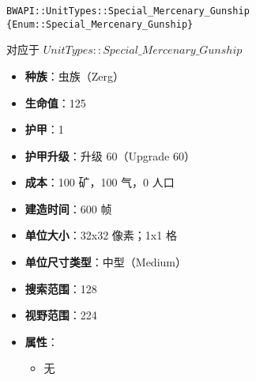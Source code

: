 \begin{tcolorbox}[colback=white, colframe=black!60!white, title=Special\_Mercenary\_Gunship(), arc=0mm]
    \begin{verbatim}
BWAPI::UnitTypes::Special_Mercenary_Gunship {Enum::Special_Mercenary_Gunship}
    \end{verbatim}
    对应于  $UnitTypes::Special\_Mercenary\_Gunship$ 
    \begin{itemize}
        \item \textbf{种族}：虫族（Zerg）
        \item \textbf{生命值}：125
        \item \textbf{护甲}：1
        \item \textbf{护甲升级}：升级 60（Upgrade 60）
        \item \textbf{成本}：100 矿，100 气，0 人口
        \item \textbf{建造时间}：600 帧
        \item \textbf{单位大小}：32x32 像素；1x1 格
        \item \textbf{单位尺寸类型}：中型（Medium）
        \item \textbf{搜索范围}：128
        \item \textbf{视野范围}：224
        \item \textbf{属性}：
            \begin{itemize}
                \item 无
            \end{itemize}
    \end{itemize}
\end{tcolorbox}

